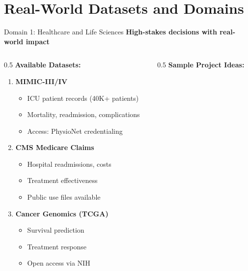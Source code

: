 
\section{Real-World Datasets and Domains}


\begin{frame}{Domain 1: Healthcare and Life Sciences}
\textbf{High-stakes decisions with real-world impact}

\begin{columns}
\begin{column}{0.5\textwidth}
\textbf{Available Datasets:}
\begin{enumerate}
\item \textbf{MIMIC-III/IV} \cite{johnson2016mimic}
   \begin{itemize}
   \item ICU patient records (40K+ patients)
   \item Mortality, readmission, complications
   \item Access: PhysioNet credentialing
   \end{itemize}

\item \textbf{CMS Medicare Claims}
   \begin{itemize}
   \item Hospital readmissions, costs
   \item Treatment effectiveness
   \item Public use files available
   \end{itemize}

\item \textbf{Cancer Genomics (TCGA)}
   \begin{itemize}
   \item Survival prediction
   \item Treatment response
   \item Open access via NIH
   \end{itemize}
\end{enumerate}
\end{column}

\begin{column}{0.5\textwidth}
\textbf{Sample Project Ideas:}


\end{column}
\end{columns}
\end{frame}
